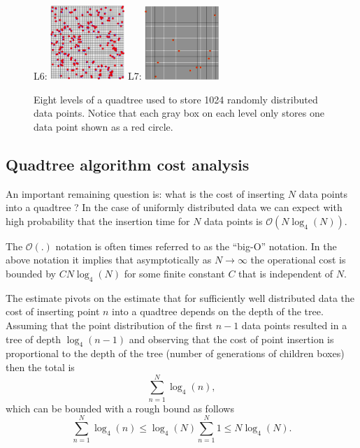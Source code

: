 \begin{figure}[htbp!]
    L6: \includegraphics[width=0.25\textwidth]{figures/L21/quadtreeBoxesLevel06-crop.pdf}
    L7: \includegraphics[width=0.25\textwidth]{figures/L21/quadtreeBoxesLevel07-crop.pdf}

    \caption{Eight levels of a quadtree used to store 1024 randomly distributed data points. Notice that each gray box on each level only stores one data point shown as a red circle. }
    \label{quadtreeExample.fig}
\end{figure}


\subsection{Quadtree algorithm cost analysis}

An important remaining question is: what is the cost of inserting $N$ data points into a quadtree ? In the case of uniformly distributed data we can expect with high probability that the insertion time for $N$ data points is $\mathcal{O}(N\log_4(N))$. 

The $\mathcal{O}(.)$ notation is often times referred to as the ``big-O'' notation. In the above notation it implies that asymptotically as $N\rightarrow\infty$ the operational cost is bounded by $CN\log_4(N)$ for some finite constant $C$ that is independent of $N$. 

The estimate pivots on the estimate that for sufficiently well distributed data the cost of inserting point $n$ into a quadtree depends on the depth of the tree. Assuming that the point distribution of the first $n-1$ data points resulted in a tree of depth $\log_4(n-1)$ and observing that the cost of point insertion is proportional to the depth of the tree (number of generations of children boxes) then the total is
\[
\sum_{n=1}^{N} \log_4(n),
\]
which can be bounded with a rough bound as follows
\[
\sum_{n=1}^{N} \log_4(n) \leq \log_4(N) \sum_{n=1}^{N} 1 \leq N\log_4(N). 
\]

